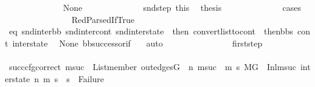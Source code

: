 \begin{isabellebody}
\ \ \ \ \ \ \ \ \ \ \ \ \isamarkupfalse%
\ None\isanewline
\ \ \ \ \ \ \ \ \ \ \ \ \isamarkupfalse%
\ snd{\isacharunderscore}{\kern0pt}step\ this\ \isamarkupfalse%
\ {\isacharquery}{\kern0pt}thesis\isanewline
\ \ \ \ \ \ \ \ \ \ \ \ \isamarkupfalse%
\ cases\isanewline
\ \ \ \ \ \ \ \ \ \ \ \ \ \ \isamarkupfalse%
\ RedParsedIfTrue\isanewline
\ \ \ \ \ \ \ \ \ \ \ \ \ \ \isamarkupfalse%
\ eq{\isacharcolon}{\kern0pt}\ {\isachardoublequoteopen}{\isacharparenleft}{\kern0pt}snd{\isacharunderscore}{\kern0pt}inter{\isacharunderscore}{\kern0pt}bb{\isacharcomma}{\kern0pt}\ snd{\isacharunderscore}{\kern0pt}inter{\isacharunderscore}{\kern0pt}cont{\isacharcomma}{\kern0pt}\ snd{\isacharunderscore}{\kern0pt}inter{\isacharunderscore}{\kern0pt}state{\isacharparenright}{\kern0pt}\ {\isacharequal}{\kern0pt}\ {\isacharparenleft}{\kern0pt}then{}{\isacharcomma}{\kern0pt}\ convert{\isacharunderscore}{\kern0pt}list{\isacharunderscore}{\kern0pt}to{\isacharunderscore}{\kern0pt}cont\ {\isacharparenleft}{\kern0pt}\ then{\isacharunderscore}{\kern0pt}bbs{\isacharparenright}{\kern0pt}\ cont{}{\isacharcomma}{\kern0pt}\ inter{\isacharunderscore}{\kern0pt}state{\isacharparenright}{\kern0pt}{\isachardoublequoteclose}\ \isamarkupfalse%
\ None\ bb{\isacharunderscore}{\kern0pt}successor{\isacharunderscore}{\kern0pt}if\ {}\ \isamarkupfalse%
\ auto\isanewline
\isanewline
\ \ \ \ \ \ \ \ \ \ \ \ \ \ \isamarkupfalse%
\ first{\isacharunderscore}{\kern0pt}step\ \isanewline
\ \ \ \ \ \ \ \ \ \ \ \ \ \ \isamarkupfalse%
\ succ{\isacharunderscore}{\kern0pt}cfg{\isacharunderscore}{\kern0pt}correct{\isacharcolon}{\kern0pt}\ {\isachardoublequoteopen}{\isacharparenleft}{\kern0pt}{\isasymforall}msuc{}{\isachardot}{\kern0pt}\ \ List{\isachardot}{\kern0pt}member\ {\isacharparenleft}{\kern0pt}out{\isacharunderscore}{\kern0pt}edges{\isacharparenleft}{\kern0pt}G{\isacharparenright}{\kern0pt}\ {\isacharbang}{\kern0pt}\ n{\isacharparenright}{\kern0pt}\ msuc{}\ {\isasymlongrightarrow}\ {\isacharparenleft}{\kern0pt}{\isasymforall}m{}\ s{}{\isachardot}{\kern0pt}\ {\isacharparenleft}{\kern0pt}{\isacharparenleft}{\kern0pt}M{\isacharcomma}{\kern0pt}{\isasymLambda}{\isacharcomma}{\kern0pt}{\isasymGamma}{\isacharcomma}{\kern0pt}{\isasymOmega}{\isacharcomma}{\kern0pt}G\ {\isasymturnstile}\ {\isacharparenleft}{\kern0pt}Inl{\isacharparenleft}{\kern0pt}msuc{}{\isacharparenright}{\kern0pt}{\isacharcomma}{\kern0pt}\ inter{\isacharunderscore}{\kern0pt}state{\isacharparenright}{\kern0pt}\ {\isacharminus}{\kern0pt}n{\isasymrightarrow}{\isacharasterisk}{\kern0pt}\ {\isacharparenleft}{\kern0pt}m{}{\isacharcomma}{\kern0pt}\ s{}{\isacharparenright}{\kern0pt}{\isacharparenright}{\kern0pt}\ {\isasymlongrightarrow}\ s{}\ {\isasymnoteq}\ Failure{\isacharparenright}{\kern0pt}{\isacharparenright}{\kern0pt}{\isacharparenright}{\kern0pt}{\isachardoublequoteclose}\isanewline

\end{isabellebody}
